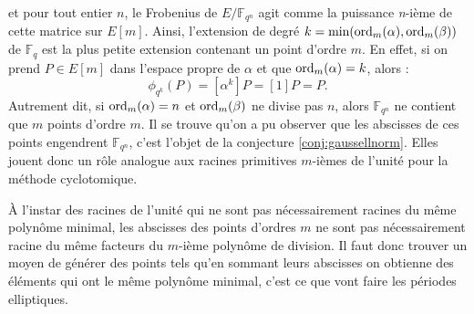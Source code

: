\documentclass[a4paper]{article} %
\numberwithin{section}{part}
\numberwithin{equation}{section}
\newcommand\nroot[1]{\textit{#1}-ième}
\newcommand\GF[1]{\mathbb{F}_{#1}}
\newcommand\ord[2]{\textup{ord}_{#1}(#2)}
\begin{document}
et pour tout entier $n$, le Frobenius de $E/\GF{q^n}$ agit comme la puissance
\nroot{n} de cette matrice sur $E[m]$. Ainsi, l'extension de degré
$k = \textup{min}(\ord{m}{\alpha},\ord{m}{\beta})$ de 
$\GF{q}$ est la plus petite extension contenant un point d'ordre $m$. En
effet, si on prend $P\in E[m]$ dans l'espace propre de $\alpha$  et que 
$\ord{m}{\alpha} = k$, alors :
\begin{equation}
\phi_{q^k}(P) = [\alpha^k]P = [1]P = P.
\end{equation}
Autrement dit, si $\ord{m}{\alpha} = n$ et $\ord{m}{\beta}$ ne divise pas $n$,
alors $\GF{q^n}$ ne contient que $m$ points d'ordre $m$. Il se trouve qu'on a pu
observer que les abscisses de ces points engendrent $\GF{q^n}$, c'est l'objet de
la conjecture \ref{conj:gaussellnorm}. Elles jouent donc un rôle analogue aux 
racines primitives $m$-ièmes de l'unité pour la méthode cyclotomique.\par

À l'instar des racines de l'unité qui ne sont pas nécessairement racines du même
polynôme minimal, les abscisses des points d'ordres $m$ ne sont pas
nécessairement racine du même facteurs du $m$-ième polynôme de division. Il
faut donc trouver un moyen de générer des points tels qu'en
sommant leurs abscisses on obtienne des éléments qui ont le même polynôme
minimal, c'est ce que vont faire les périodes elliptiques.
\end{document}
